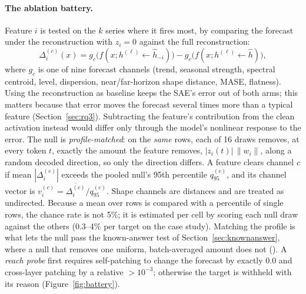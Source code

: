 \paragraph{The ablation battery.} Feature $i$ is tested on the $k$ series where it fires most, by comparing
the forecast under the reconstruction with $z_i=0$ against the full reconstruction:
\begin{equation}
  \Delta_i^{(c)}(x) = g_c\big(f(x;h^{(\ell)}\!\leftarrow\!\hat h_{-i})\big) - g_c\big(f(x;h^{(\ell)}\!\leftarrow\!\hat h)\big),
  \label{eq:ablation}
\end{equation}
where $g_c$ is one of nine forecast channels (trend, seasonal strength, spectral centroid, level, dispersion,
near/far-horizon shape distance, MASE, flatness). Using the reconstruction as baseline keeps the SAE's error
out of both arms; this matters because that error moves the forecast several times more than a typical feature
(Section~\ref{sec:rq3}). Subtracting the feature's contribution from the clean activation instead would differ only
through the model's nonlinear response to the error. The null is \emph{profile-matched}: on the \emph{same} rows, each of 16
draws removes, at every token $t$, exactly the amount the feature removes, $|z_i(t)|\,\|w_i\|$, along a random
decoded direction, so only the direction differs. A feature clears channel $c$ if mean $|\Delta_i^{(c)}|$
exceeds the pooled null's 95th percentile $q_{95}^{(c)}$, and its channel vector is
$v_i^{(c)}=\overline{\Delta_i^{(c)}}/q_{95}^{(c)}$. Shape channels are distances and are treated as undirected.
Because a mean over rows is compared with a percentile of single rows, the chance rate is not 5\%; it is
estimated per cell by scoring each null draw against the others (0.3--4\% per target on the case study). Matching the
profile is what lets the null pass the known-answer test of Section~\ref{sec:knownanswer}, where a null that removes one
uniform, batch-averaged amount does not (). A \emph{reach probe} first requires self-patching to change the
forecast by exactly $0.0$ and cross-layer patching by a relative $>10^{-3}$; otherwise the target is withheld
with its reason (Figure~\ref{fig:battery}).

